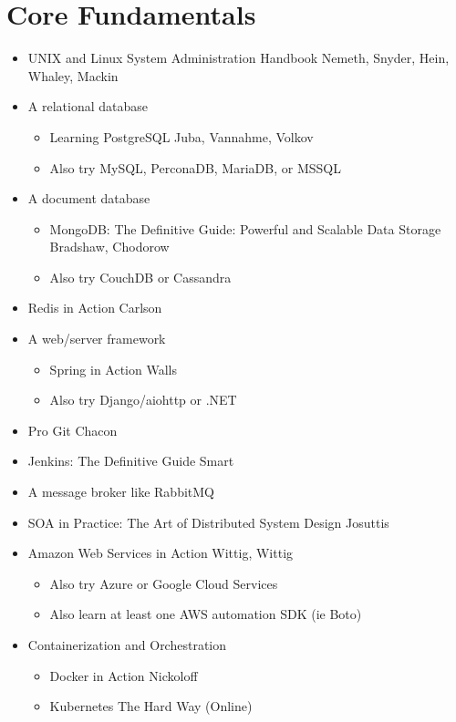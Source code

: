 \documentclass[12pt]{article}
\begin{document}
\section{Core Fundamentals}
\begin{itemize}
\item UNIX and Linux System Administration Handbook Nemeth, Snyder, Hein, Whaley, Mackin
\item A relational database
  \begin{itemize}
  \item Learning PostgreSQL Juba, Vannahme, Volkov
  \item Also try MySQL, PerconaDB, MariaDB, or MSSQL
  \end{itemize}
\item A document database
  \begin{itemize}
  \item MongoDB: The Definitive Guide: Powerful and Scalable Data
    Storage Bradshaw, Chodorow
  \item Also try CouchDB or Cassandra
  \end{itemize}
\item Redis in Action Carlson
\item A web/server framework
  \begin{itemize}
  \item Spring in Action Walls
  \item Also try Django/aiohttp or .NET
  \end{itemize}
\item Pro Git Chacon
\item Jenkins: The Definitive Guide Smart
\item A message broker like RabbitMQ
\item SOA in Practice: The Art of Distributed System Design Josuttis
\item Amazon Web Services in Action Wittig, Wittig
  \begin{itemize}
  \item Also try Azure or Google Cloud Services
  \item Also learn at least one AWS automation SDK (ie Boto)
  \end{itemize}
\item Containerization and Orchestration
  \begin{itemize}
  \item Docker in Action Nickoloff
  \item Kubernetes The Hard Way (Online)
  \end{itemize}

\end{itemize}
\end{document}
